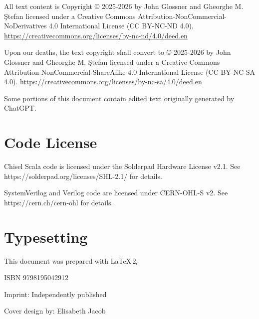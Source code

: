 \documentclass[11pt]{book}
\begin{document}

All text content is Copyright © 2025-2026 by John Glossner and Gheorghe M. \c{S}tefan licensed under a Creative Commons Attribution-NonCommercial-NoDerivatives 4.0 International License (CC BY-NC-ND 4.0). \url{https://creativecommons.org/licenses/by-nc-nd/4.0/deed.en}

\vspace{\baselineskip}\par
\noindent Upon our deaths, the text copyright shall convert to © 2025-2026 by John Glossner and Gheorghe M. \c{S}tefan licensed under a Creative Commons Attribution-NonCommercial-ShareAlike 4.0 International License (CC BY-NC-SA 4.0). \url{https://creativecommons.org/licenses/by-nc-sa/4.0/deed.en}

\vspace{\baselineskip}\par
\noindent Some portions of this document contain edited text originally generated by ChatGPT. 

\section*{Code License}
Chisel Scala code is licensed under the Solderpad Hardware License v2.1. See https://solderpad.org/licenses/SHL-2.1/ for details.

\vspace{\baselineskip}\par
{}
\noindent SystemVerilog and Verilog code are licensed under CERN-OHL-S v2. See https://cern.ch/cern-ohl for details.

\section*{Typesetting}
This document was prepared with \LaTeX $\, 2_{\epsilon}$

\bigskip

\bigskip

ISBN 9798195042912

Imprint: Independently published

\bigskip

Cover design by: Elisabeth Jacob
\end{document}
